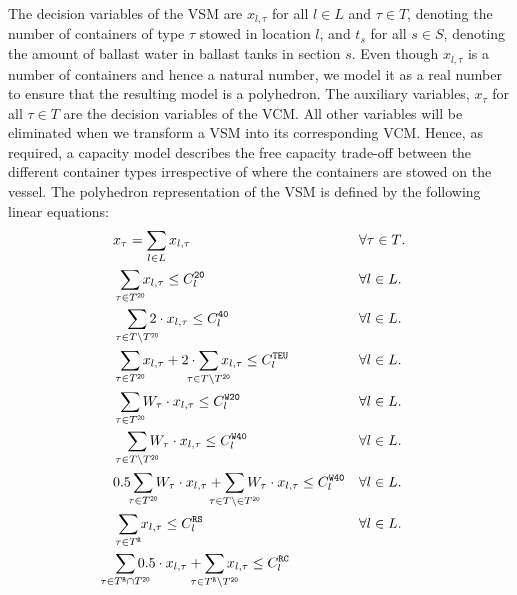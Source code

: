 The decision variables of the VSM are $x_{l,\tau}$ for all $l\in L$ and $\tau \in T$, denoting the number of containers of type $\tau$ stowed in location $l$, and $t_s$ for all $s\in S$, denoting the amount of ballast water in ballast tanks in section $s$. Even though $x_{l,\tau}$ is a number of containers and hence a natural number, we model it as a real number to ensure that the resulting model is a polyhedron. The auxiliary variables, $x_\tau$ for all $\tau\in T$ are the decision variables of the VCM. All other variables will be eliminated when we transform a VSM into its corresponding VCM. Hence, as required, a capacity model describes the free capacity trade-off between the different container types irrespective of where the containers are stowed on the vessel. The polyhedron representation of the VSM is defined by the following linear equations:
\begin{align}
	\label{typeDef}
	&x_\tau = \sum_{l\in L} x_{l,\tau} 
			&& \forall{\tau \in T}.\\
		\label{20Cap}
	&\smashoperator[r]{\sum_{\tau \in T^\trt{20}}} x_{l,\tau} \leq C_l^\trt{20}
			&& \forall l \in L.\\
	\label{40Cap}    	
	&\smashoperator[r]{\sum_{\tau \in T\setminus T^\trt{20}}} 2\cdot x_{l,\tau} \leq C_l^\trt{40} 
			&& \forall l \in L.\\
	\label{teuCap}
	&\smashoperator[r]{\sum_{\tau \in T^\trt{20}}} x_{l,\tau} + 2\cdot\smashoperator[lr]{\sum_{\tau \in T\setminus T^\trt{20}}} x_{l,\tau} \leq C_l^\trt{TEU} 
			&& \forall l \in L.\\
	\label{weight20Cap}
	&\smashoperator[r]{\sum_{\tau \in T^\trt{20}}} W_\tau\cdot x_{l,\tau} \leq C_l^\trt{W20} 
			&& \forall l \in L.\\
	\label{weight40Cap}
	&\smashoperator[r]{\sum_{\tau \in T\setminus T^\trt{20}}} W_\tau\cdot x_{l,\tau} \leq C_l^\trt{W40} 
			&& \forall l \in L. \\
	\label{combinedWeightCap}
	&0.5 \smashoperator[lr]{\sum_{\tau \in T^\trt{20}}} W_\tau\cdot x_{l,\tau} + \smashoperator[lr]{\sum_{\tau \in T\setminus \in T^\trt{20}}} W_\tau\cdot x_{l,\tau} \leq C_l^\trt{W40} 
			&& \forall l \in L.\\
	\label{reeferSlotCap}
	&\smashoperator[r]{\sum_{\tau \in T^\trt{R}}} x_{l,\tau} \leq C_l^\trt{RS} 
			&& \forall l \in L. \\
	\label{reeferCellCap}
	&\smashoperator[lr]{\sum_{\tau \in T^\trt{R}\cap T^\trt{20}}} 0.5\cdot x_{l,\tau} + \smashoperator[lr]{\sum_{\tau \in T^\trt{R}\setminus T^\trt{20}}} x_{l,\tau} \leq C_l^\trt{RC} 

\end{align}
